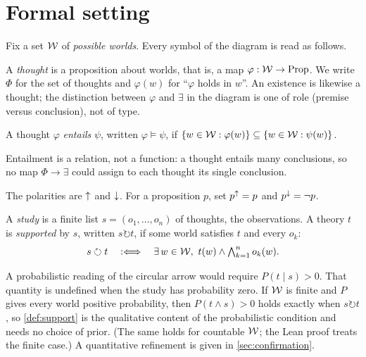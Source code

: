 \section{Formal setting}\label{sec:setting}

Fix a set $\mathcal W$ of \emph{possible worlds}. Every symbol of the diagram is read as follows.

\begin{definition}[Thought]
A \emph{thought} is a proposition about worlds, that is, a map $\varphi:\mathcal W\to\mathrm{Prop}$. We
write $\Phi$ for the set of thoughts and $\varphi(w)$ for ``$\varphi$ holds in $w$''. An
existence is likewise a thought; the distinction between $\varphi$ and $\exists$ in the diagram is
one of role (premise versus conclusion), not of type.
\end{definition}

\begin{definition}[Entailment]\label{def:entails}
A thought $\varphi$ \emph{entails} $\psi$, written $\varphi\models\psi$, if
$\{w\in\mathcal W : \varphi(w)\}\subseteq\{w\in\mathcal W : \psi(w)\}$.
\end{definition}

Entailment is a relation, not a function: a thought entails many conclusions, so no map
$\Phi\to\exists$ could assign to each thought its single conclusion.

\begin{definition}[Polarity]
The polarities are ${\uparrow}$ and ${\downarrow}$. For a proposition $p$, set $p^{{\uparrow}}=p$ and $p^{{\downarrow}}=\neg p$.
\end{definition}

\begin{definition}\label{def:support}
A \emph{study} is a finite list $s=(o_1,\dots,o_n)$ of thoughts, the observations. A theory $t$ is
\emph{supported} by $s$, written $s\circlearrowright t$, if some world satisfies $t$ and every
$o_k$:
\[
  s\circlearrowright t \quad:\Longleftrightarrow\quad \exists\, w\in\mathcal W,\ t(w)\wedge
  \textstyle\bigwedge_{k=1}^n o_k(w).
\]
\end{definition}

\begin{remark}\label{rem:probability}
A probabilistic reading of the circular arrow would require $P(t\mid s)>0$. That quantity is
undefined when the study has probability zero. If $\mathcal W$ is finite and $P$ gives every world positive probability,
then $P(t\wedge s)>0$ holds exactly when $s\circlearrowright t$, so \cref{def:support} is the
qualitative content of the probabilistic condition and needs no choice of prior. (The same holds for
countable $\mathcal W$; the Lean proof treats the finite case.) A quantitative refinement is given in
\cref{sec:confirmation}.
\end{remark}
